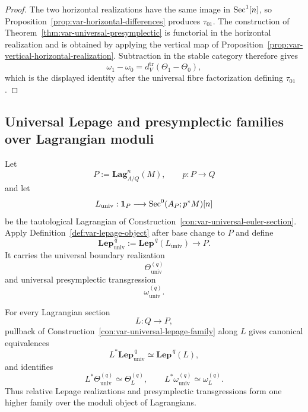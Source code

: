 \begin{proof}
The two horizontal realizations have the same image in \(\operatorname{Sec}^1[n]\), so Proposition~\ref{prop:var-horizontal-differences} produces \(\tau_{01}\).  The construction of Theorem~\ref{thm:var-universal-presymplectic} is functorial in the horizontal realization and is obtained by applying the vertical map of Proposition~\ref{prop:var-vertical-horizontal-realization}.  Subtraction in the stable category therefore gives
\[
    \omega_1-\omega_0
    =
    d_V^{\mathrm{tr}}(\Theta_1-\Theta_0),
\]
which is the displayed identity after the universal fibre factorization defining \(\tau_{01}\).
\end{proof}


\subsection{Universal Lepage and presymplectic families over Lagrangian moduli}

\begin{construction}
\label{con:var-universal-lepage-family}
Let
\[
    P:=\mathbf{Lag}^n_{A/Q}(M),
    \qquad
    p:P\longrightarrow Q
\]
and let
\[
    L_{\mathrm{univ}}:
    \mathbf 1_P\longrightarrow
    \operatorname{Sec}^0(A_P;p^*M)[n]
\]
be the tautological Lagrangian of Construction~\ref{con:var-universal-euler-section}.  Apply Definition~\ref{def:var-lepage-object} after base change to \(P\) and define
\[
    \boxed{
    \mathbf{Lep}^{\,q}_{\mathrm{univ}}
    :=
    \mathbf{Lep}^{\,q}(L_{\mathrm{univ}})
    \longrightarrow P.
    }
\]
It carries the universal boundary realization
\[
    \Theta_{\mathrm{univ}}^{(q)}
\]
and universal presymplectic transgression
\[
    \omega_{\mathrm{univ}}^{(q)}.
\]
\end{construction}

\begin{theorem}
\label{thm:var-lepage-family-pullback}
For every Lagrangian section
\[
    L:Q\longrightarrow P,
\]
pullback of Construction~\ref{con:var-universal-lepage-family} along \(L\) gives canonical equivalences
\[
    \boxed{
    L^*\mathbf{Lep}^{\,q}_{\mathrm{univ}}
    \simeq
    \mathbf{Lep}^{\,q}(L),
    }
\]
and identifies
\[
    L^*\Theta_{\mathrm{univ}}^{(q)}
    \simeq
    \Theta_L^{(q)},
    \qquad
    L^*\omega_{\mathrm{univ}}^{(q)}
    \simeq
    \omega_L^{(q)}.
\]
Thus relative Lepage realizations and presymplectic transgressions form one higher family over the moduli object of Lagrangians.
\end{theorem}

